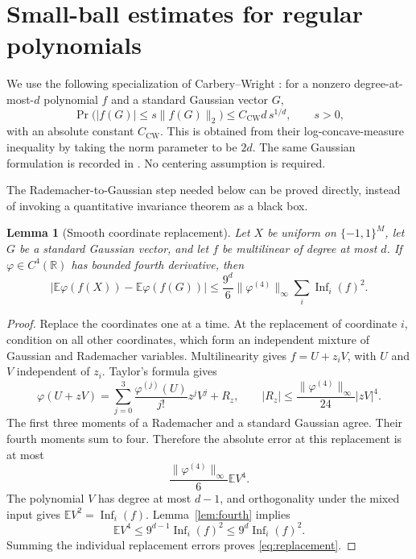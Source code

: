 \documentclass[11pt]{article}
\newcommand{\E}{\mathbb E}
\newcommand{\R}{\mathbb R}
\newcommand{\Inf}{\operatorname{Inf}}
\newcommand{\1}{\mathbf 1}
\newtheorem{lemma}[theorem]{Lemma}
\theoremstyle{definition}
\theoremstyle{remark}
\numberwithin{equation}{section}
\begin{document}
\section{Small-ball estimates for regular polynomials}

We use the following specialization of Carbery--Wright \cite[Theorem 8]{CW}: for a nonzero degree-at-most-$d$ polynomial $f$ and a standard Gaussian vector $G$,
\begin{equation}\label{eq:CW}
 \Pr\bigl(|f(G)|\le s\|f(G)\|_2\bigr)
 \le C_{\mathrm{CW}}d\,s^{1/d},\qquad s>0,
\end{equation}
with an absolute constant $C_{\mathrm{CW}}$. This is obtained from their log-concave-measure inequality by taking the norm parameter to be $2d$. The same Gaussian formulation is recorded in \cite[Theorem 8]{DSTW}. No centering assumption is required.

The Rademacher-to-Gaussian step needed below can be proved directly, instead of invoking a quantitative invariance theorem as a black box.

\begin{lemma}[Smooth coordinate replacement]\label{lem:replacement}
Let $X$ be uniform on $\{-1,1\}^M$, let $G$ be a standard Gaussian vector, and let $f$ be multilinear of degree at most $d$. If $\varphi\in C^4(\R)$ has bounded fourth derivative, then
\begin{equation}\label{eq:replacement}
 \left|\E\varphi(f(X))-\E\varphi(f(G))\right|
 \le\frac{9^d}{6}\|\varphi^{(4)}\|_\infty
       \sum_i\Inf_i(f)^2.
\end{equation}
\end{lemma}
\begin{proof}
Replace the coordinates one at a time. At the replacement of coordinate $i$, condition on all other coordinates, which form an independent mixture of Gaussian and Rademacher variables. Multilinearity gives $f=U+z_iV$, with $U$ and $V$ independent of $z_i$. Taylor's formula gives
\[
 \varphi(U+zV)=\sum_{j=0}^3\frac{\varphi^{(j)}(U)}{j!}z^jV^j+R_z,
 \qquad |R_z|\le\frac{\|\varphi^{(4)}\|_\infty}{24}|zV|^4.
\]
The first three moments of a Rademacher and a standard Gaussian agree. Their fourth moments sum to four. Therefore the absolute error at this replacement is at most
\[
 \frac{\|\varphi^{(4)}\|_\infty}{6}\E V^4.
\]
The polynomial $V$ has degree at most $d-1$, and orthogonality under the mixed input gives $\E V^2=\Inf_i(f)$. Lemma~\ref{lem:fourth} implies
\[
 \E V^4\le9^{d-1}\Inf_i(f)^2\le9^d\Inf_i(f)^2.
\]
Summing the individual replacement errors proves \eqref{eq:replacement}.
\end{proof}
\end{document}
